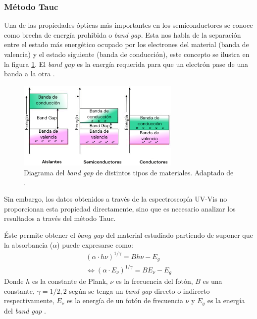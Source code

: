 \documentclass[../main.tex]{subfiles}
\begin{document}
\subsubsection{Método Tauc}
Una de las propiedades ópticas más importantes en los semiconductores se conoce como brecha de energía prohibida o \textit{band gap}. Esta nos habla de la separación entre el estado más energético ocupado por los electrones del material (banda de valencia) y el estado siguiente (banda de conducción), este concepto se ilustra en la figura \ref{fig:diagbandgap}. El \textit{band gap} es la energía requerida para que un electrón pase de una banda a la otra \cite{Ashcroft1976}.
\begin{figure}[H]
    \centering
    \includegraphics[width=0.7\textwidth]{fig/bandgapdiag.png}
    \caption{Diagrama del \textit{band gap} de distintos tipos de materiales. Adaptado de \cite{Ozan2020}.}
    \label{fig:diagbandgap}
\end{figure}
Sin embargo, los datos obtenidos a través de la espectroscopía UV-Vis no proporcionan esta propiedad directamente, sino que es necesario analizar los resultados a través del método Tauc.

Éste permite obtener el \textit{bang gap} del material estudiado partiendo de suponer que la absorbancia ($\alpha$) puede expresarse como:
\begin{equation}
    \begin{split}
        (\alpha\cdot h\nu)^{1/\gamma}=Bh\nu-E_g\\
        \iff (\alpha\cdot E_\nu)^{1/\gamma}=BE_\nu-E_g
    \end{split}
    \label{eq:taucalpha}
\end{equation}
Donde $h$ es la constante de Plank, $\nu$ es la frecuencia del fotón, $B$ es una constante, $\gamma=1/2, 2$ según se tenga un \textit{band gap} directo o indirecto respectivamente, $E_\nu$ es la energía de un fotón de frecuencia $\nu$ y $E_g$ es la energía del \textit{band gap} \cite{Makula2018}.
\end{document}
